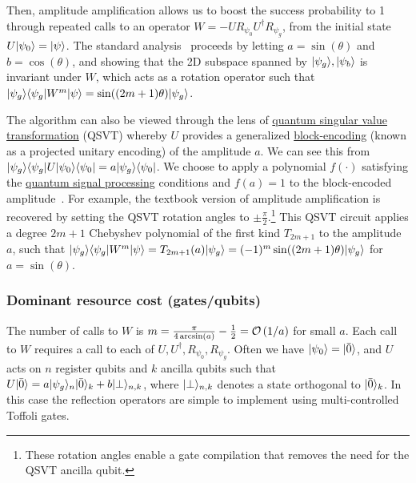 \begin{refsection}
Then, amplitude amplification allows us to boost the success probability to 1 through repeated calls to an operator $W = - U R_{\psi_0} U^\dag R_{\psi_g}$, from the initial state $U \lvert\psi_0\rangle = \lvert\psi\rangle$. The standard analysis~\cite{brassard2002AmpAndEst} proceeds by letting $a=\sin(\theta)$ and $b=\cos(\theta)$, and showing that the 2D subspace spanned by $\lvert\psi_g\rangle, \lvert\psi_b\rangle$ is invariant under $W$, which acts as a rotation operator such that $ \lvert\psi_g\rangle\langle\psi_g\rvert W^m \lvert\psi\rangle = \sin((2m+1)\theta) \lvert\psi_g\rangle$.

The algorithm can also be viewed through the lens of \hyperref[prim:QSVT]{quantum singular value transformation} (QSVT) whereby $U$ provides a generalized \hyperref[prim:BlockEncodings]{block-encoding} (known as a projected unitary encoding) of the amplitude $a$. We can see this from $\lvert\psi_g\rangle\langle\psi_g\rvert U \lvert\psi_0\rangle\langle\psi_0\rvert = a\lvert\psi_g\rangle\langle\psi_0\rvert$. We choose to apply a polynomial $f(\cdot)$ satisfying the \hyperref[prim:QSP]{quantum signal processing} conditions and $f(a)=1$ to the block-encoded amplitude~\cite[Theorem 27 \& 28]{gilyen2018QSingValTransfArXiv}. For example, the textbook version of amplitude amplification is recovered by setting the QSVT rotation angles to $\pm \frac{\pi}{2}$.\footnote{These rotation angles enable a gate compilation that removes the need for the QSVT ancilla qubit.} This QSVT circuit applies a degree $2m+1$ Chebyshev polynomial of the first kind $T_{2m+1}$ to the amplitude $a$, such that $\lvert\psi_g\rangle\langle\psi_g\rvert W^m \lvert\psi\rangle = T_{2m+1}(a) \lvert\psi_g\rangle = (-1)^m \sin((2m+1)\theta) \lvert\psi_g\rangle$ for $a=\sin(\theta)$. 





\subsubsection*{Dominant resource cost (gates/qubits)}
The number of calls to $W$ is $m = \frac{\pi}{4\arcsin(a)} - \frac{1}{2} = \mathcal{O}\left( 1/a \right)$ for small $a$. Each call to $W$ requires a call to each of $U, U^\dag, R_{\psi_0}, R_{\psi_g}$. Often we have $\lvert\psi_0\rangle = \lvert\bar{0}\rangle$, and $U$ acts on $n$ register qubits and $k$ ancilla qubits such that $U\lvert\bar{0}\rangle = a\lvert\psi_g\rangle_n\lvert\bar{0}\rangle_k + b \lvert\perp\rangle_{n,k}$, where $\lvert\perp\rangle_{n,k}$ denotes a state orthogonal to $\lvert\bar{0}\rangle_k$. In this case the reflection operators are simple to implement using multi-controlled Toffoli gates. 



\end{refsection}
